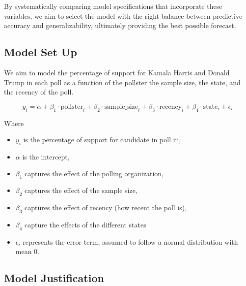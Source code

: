 \documentclass[
  letterpaper,
  DIV=11,
  numbers=noendperiod]{scrartcl}
\begin{document}
By systematically comparing model specifications that incorporate these
variables, we aim to select the model with the right balance between
predictive accuracy and generalizability, ultimately providing the best
possible forecast.

\hypertarget{model-set-up}{%
\subsection{Model Set Up}\label{model-set-up}}

We aim to model the percentage of support for Kamala Harris and Donald
Trump in each poll as a function of the pollster the sample size, the
state, and the recency of the poll.

\[
y_i = \alpha + \beta_1 \cdot \mathrm{pollster}_i + \beta_2 \cdot \mathrm{sample\_size}_i + \beta_3 \cdot \mathrm{recency}_i +  \beta_4 \cdot \mathrm{state}_i + \epsilon_i
\]

Where

\begin{itemize}
\item
  \(y_i\)\hspace{0pt} is the percentage of support for candidate in poll
  iii,
\item
  \(α\) is the intercept,
\item
  \(β_1\) captures the effect of the polling organization,
\item
  \(β_2​\) captures the effect of the sample size,
\item
  \(β_3\)\hspace{0pt} captures the effect of recency (how recent the
  poll is),
\item
  \(β_4\) capture the effects of the different states
\item
  \hspace{0pt} \(\epsilon_i\) represents the error term, assumed to
  follow a normal distribution with mean 0.
\end{itemize}

\hypertarget{model-justification}{%
\subsection{Model Justification}\label{model-justification}}
\end{document}

